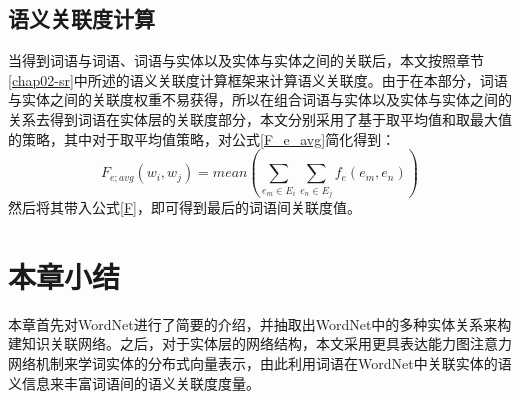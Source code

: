 \subsection{语义关联度计算}
当得到词语与词语、词语与实体以及实体与实体之间的关联后，本文按照章节\ref{chap02-sr}中所述的语义关联度计算框架来计算语义关联度。由于在本部分，词语与实体之间的关联度权重不易获得，所以在组合词语与实体以及实体与实体之间的关系去得到词语在实体层的关联度部分，本文分别采用了基于取平均值和取最大值的策略，其中对于取平均值策略，对公式\ref{F_e_avg}简化得到：
\begin{equation}
    F_{e;avg}(w_i, w_j) = mean(\sum_{e_m \in E_i}^{ }\sum_{e_n \in E_j}^{ }f_e(e_m, e_n))
    \label{F_e_avg_simple}
\end{equation}
\noindent 然后将其带入公式\ref{F}，即可得到最后的词语间关联度值。


\section{本章小结}
本章首先对WordNet进行了简要的介绍，并抽取出WordNet中的多种实体关系来构建知识关联网络。之后，对于实体层的网络结构，本文采用更具表达能力图注意力网络机制来学词实体的分布式向量表示，由此利用词语在WordNet中关联实体的语义信息来丰富词语间的语义关联度度量。